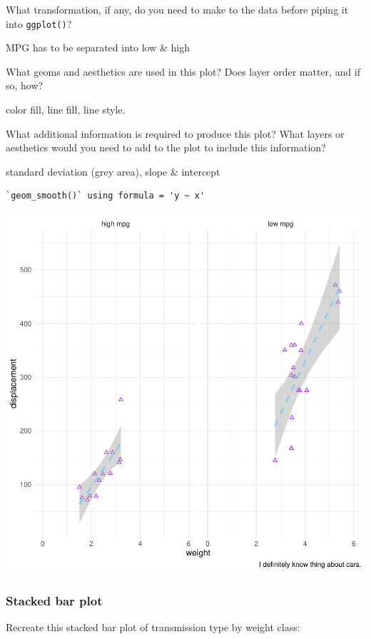 \documentclass[
  man,
  floatsintext,
  longtable,
  nolmodern,
  notxfonts,
  notimes,
  colorlinks=true,linkcolor=blue,citecolor=blue,urlcolor=blue]{apa7}
\begin{document}
What transformation, if any, do you need to make to the data before
piping it into \texttt{ggplot()}?

MPG has to be separated into low \& high

What geoms and aesthetics are used in this plot? Does layer order
matter, and if so, how?

color fill, line fill, line style.

What additional information is required to produce this plot? What
layers or aesthetics would you need to add to the plot to include this
information?

standard deviation (grey area), slope \& intercept

\begin{verbatim}
`geom_smooth()` using formula = 'y ~ x'
\end{verbatim}

\includegraphics{data-visualization_files/figure-pdf/Faceted Scatterplot-1.pdf}

\subsubsection{Stacked bar plot}\label{stacked-bar-plot}

Recreate this stacked bar plot of transmission type by weight class:
\end{document}
